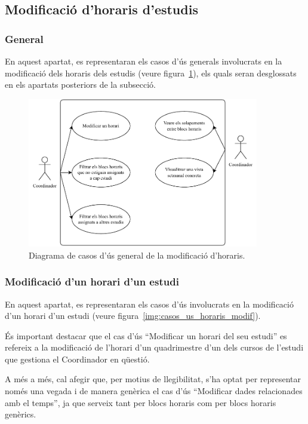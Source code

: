 \documentclass[a4paper,12pt]{ThesisStyle}
\begin{document}
\subsection{Modificació d'horaris d'estudis}
\label{subsec:casos_us_modif_horaris}

\subsubsection{General}

En aquest apartat, es representaran els casos d'ús generals involucrats en la modificació dels horaris dels estudis (veure figura~\ref{img:casos_us_modif_horaris_general}), els quals seran desglossats en els apartats posteriors de la subsecció.

\begin{figure}[H]
  \centering
  \includegraphics[width=0.9\textwidth]{assets/use_cases/horaris/modificar/general.pdf}
  \caption{\label{img:casos_us_modif_horaris_general}Diagrama de casos d'ús general de la modificació d'horaris.}
\end{figure}

\subsubsection{Modificació d'un horari d'un estudi}

En aquest apartat, es representaran els casos d'ús involucrats en la modificació d'un horari d'un estudi (veure figura~\ref{img:casos_us_horaris_modif}).

És important destacar que el cas d'ús ``Modificar un horari del seu estudi'' es refereix a la modificació de l'horari d'un quadrimestre d'un dels cursos de l'estudi que gestiona el Coordinador en qüestió.

A més a més, cal afegir que, per motius de llegibilitat, s'ha optat per representar només una vegada i de manera genèrica el cas d'ús ``Modificar dades relacionades amb el temps'', ja que serveix tant per blocs horaris com per blocs horaris genèrics.
\end{document}

